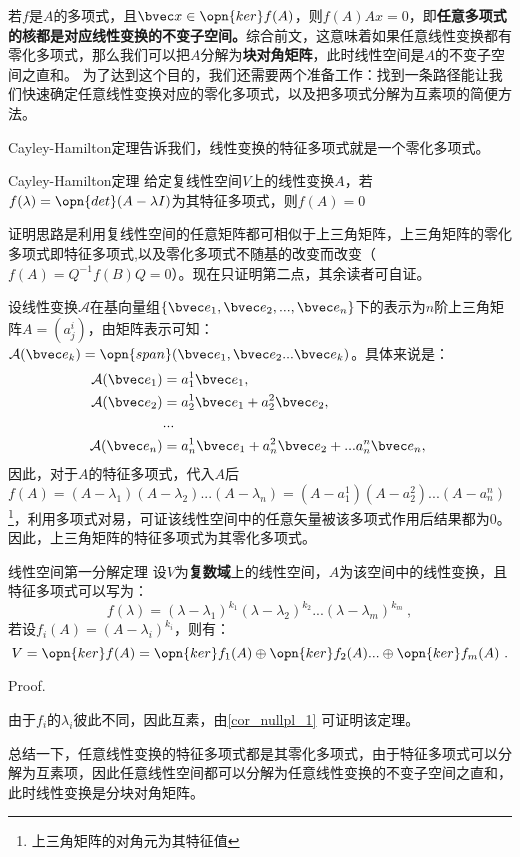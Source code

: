 若$f$是$A$的多项式，且$\bvec x\in \opn{ker}f(A)$，则$f(A)A x=0$，即\textbf{任意多项式的核都是对应线性变换的不变子空间。}综合前文，这意味着如果任意线性变换都有零化多项式，那么我们可以把$A$分解为\textbf{块对角矩阵}，此时线性空间是$A$的不变子空间之直和。
为了达到这个目的，我们还需要两个准备工作：找到一条路径能让我们快速确定任意线性变换对应的零化多项式，以及把多项式分解为互素项的简便方法。

Cayley-Hamilton定理告诉我们，线性变换的特征多项式就是一个零化多项式。
\begin{theorem}{Cayley-Hamilton定理}
给定复线性空间$V$上的线性变换$A$，若$f(\lambda)=\opn{det}(A-\lambda I)$为其特征多项式，则$f(A)=0$
\end{theorem}
证明思路是利用复线性空间的任意矩阵都可相似于上三角矩阵，上三角矩阵的零化多项式即特征多项式,以及零化多项式不随基的改变而改变（$f(A)=Q^{-1}f(B)Q=0$）。现在只证明第二点，其余读者可自证。

设线性变换$\mathcal A$在基向量组$\{\bvec e_1,\bvec e_2,...,\bvec e_n\}$下的表示为$n$阶上三角矩阵$A=(a^i_j)$，由矩阵表示可知：$\mathcal A(\bvec e_k)=\opn{span}(\bvec e_1,\bvec e_2...\bvec e_k)$。具体来说是：
\begin{equation}
\begin{aligned}
\mathcal A(\bvec e_1)&=a^1_1 \bvec e_1,\\
\mathcal A(\bvec e_2)&=a^1_2 \bvec e_1+a^2_2\bvec e_2,\\
&...\\
\mathcal A(\bvec e_n)&=a^1_n \bvec e_1+a^2_n\bvec e_2+...a^n_n\bvec e_n,\\
\end{aligned}~
\end{equation}
因此，对于$A$的特征多项式，代入$A$后$f(A)=(A-\lambda_1)(A-\lambda_2)...(A-\lambda_n)=(A-a^1_1)(A-a^2_2)...(A-a^n_n)$\footnote{上三角矩阵的对角元为其特征值}，利用多项式对易，可证该线性空间中的任意矢量被该多项式作用后结果都为$0$。因此，上三角矩阵的特征多项式为其零化多项式。
\begin{theorem}{线性空间第一分解定理}
设$V$为\textbf{复数域}上的线性空间，$A$为该空间中的线性变换，且特征多项式可以写为：
\begin{equation}
f(\lambda)=(\lambda-\lambda_1)^{k_1}(\lambda-\lambda_2)^{k_2}...(\lambda-\lambda_m)^{k_m}~,
\end{equation}
若设$f_i(A)=(A-\lambda_i)^{k_i}$，则有：
\begin{equation}
V=\opn{ker}f(A)=\opn{ker}f_1(A)\oplus\opn{ker}f_2(A)...\oplus\opn{ker}f_m(A)~.
\end{equation}
\end{theorem}
Proof.

由于$f_i$的$\lambda_i$彼此不同，因此互素，由\autoref{cor_nullpl_1} 可证明该定理。

总结一下，任意线性变换的特征多项式都是其零化多项式，由于特征多项式可以分解为互素项，因此任意线性空间都可以分解为任意线性变换的不变子空间之直和，此时线性变换是分块对角矩阵。

